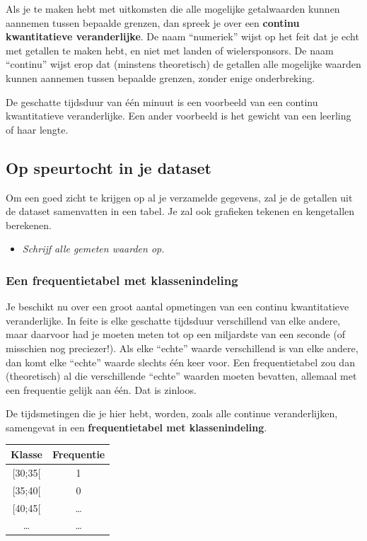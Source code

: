 \documentclass[11pt]{article}
\newcommand{\vraag}[2]{\begin{itemize}\item {\it #1} \vspace*{#2}\end{itemize}}
\begin{document}
Als je te maken hebt met uitkomsten die alle mogelijke getalwaarden kunnen aannemen tussen
bepaalde grenzen, dan spreek je over een {\bf continu kwantitatieve veranderlijke}. De
naam “numeriek” wijst op het feit dat je echt met getallen te maken hebt, en niet met landen of
wielersponsors. De naam “continu” wijst erop dat (minstens theoretisch) de getallen alle mogelijke
waarden kunnen aannemen tussen bepaalde grenzen, zonder enige onderbreking.

De geschatte tijdsduur van één minuut is een voorbeeld van een continu kwantitatieve veranderlijke.
Een ander voorbeeld is het gewicht van een leerling of haar lengte.

\subsection{Op speurtocht in je dataset}

Om een goed zicht te krijgen op al je verzamelde gegevens, zal je de
getallen uit de dataset samenvatten in een tabel. Je zal ook grafieken
tekenen en kengetallen berekenen.

\vraag{Schrijf alle gemeten waarden op.}{5cm}


\subsubsection{Een frequentietabel met klassenindeling}

Je beschikt nu over een groot aantal opmetingen van een continu kwantitatieve veranderlijke. In feite is
elke geschatte tijdsduur verschillend van elke andere, maar daarvoor had je moeten meten tot op een
miljardste van een seconde (of misschien nog preciezer!). Als elke “echte” waarde verschillend is
van elke andere, dan komt elke “echte” waarde slechts één keer voor. Een frequentietabel zou dan
(theoretisch) al die verschillende “echte” waarden moeten bevatten, allemaal met een frequentie
gelijk aan één. Dat is zinloos.

De tijdsmetingen die je hier hebt, worden, zoals alle continue veranderlijken, samengevat in een
{\bf frequentietabel met klassenindeling}.

\begin{center}
  \begin{tabular}{|c|c|}
    \hline
    Klasse & Frequentie\\
    \hline
    [30;35[ & 1\\    
    \hline
    [35;40[ & 0\\
    \hline
    [40;45[ & \ldots\\ 
    \hline
    \ldots & \ldots\\ 
    \hline
  \end{tabular}
\end{center}
\end{document}
